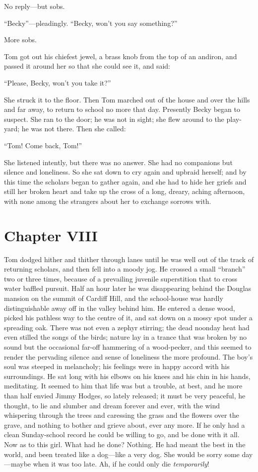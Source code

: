 \documentclass{book}
\begin{document}
No reply—but sobs.

“Becky”—pleadingly. “Becky, won’t you say something?”

More sobs.

Tom got out his chiefest jewel, a brass knob from the top of an andiron, and passed it around her so that she could see it, and said:

“Please, Becky, won’t you take it?”

She struck it to the floor. Then Tom marched out of the house and over the hills and far away, to return to school no more that day. Presently Becky began to suspect. She ran to the door; he was not in sight; she flew around to the play-yard; he was not there. Then she called:

“Tom! Come back, Tom!”

She listened intently, but there was no answer. She had no companions but silence and loneliness. So she sat down to cry again and upbraid herself; and by this time the scholars began to gather again, and she had to hide her griefs and still her broken heart and take up the cross of a long, dreary, aching afternoon, with none among the strangers about her to exchange sorrows with.

\chapter*{Chapter VIII}

Tom dodged hither and thither through lanes until he was well out of the track of returning scholars, and then fell into a moody jog. He crossed a small “branch” two or three times, because of a prevailing juvenile superstition that to cross water baffled pursuit. Half an hour later he was disappearing behind the Douglas mansion on the summit of Cardiff Hill, and the school-house was hardly distinguishable away off in the valley behind him. He entered a dense wood, picked his pathless way to the centre of it, and sat down on a mossy spot under a spreading oak. There was not even a zephyr stirring; the dead noonday heat had even stilled the songs of the birds; nature lay in a trance that was broken by no sound but the occasional far-off hammering of a wood-pecker, and this seemed to render the pervading silence and sense of loneliness the more profound. The boy’s soul was steeped in melancholy; his feelings were in happy accord with his surroundings. He sat long with his elbows on his knees and his chin in his hands, meditating. It seemed to him that life was but a trouble, at best, and he more than half envied Jimmy Hodges, so lately released; it must be very peaceful, he thought, to lie and slumber and dream forever and ever, with the wind whispering through the trees and caressing the grass and the flowers over the grave, and nothing to bother and grieve about, ever any more. If he only had a clean Sunday-school record he could be willing to go, and be done with it all. Now as to this girl. What had he done? Nothing. He had meant the best in the world, and been treated like a dog—like a very dog. She would be sorry some day—maybe when it was too late. Ah, if he could only die \emph{temporarily}!
\end{document}

